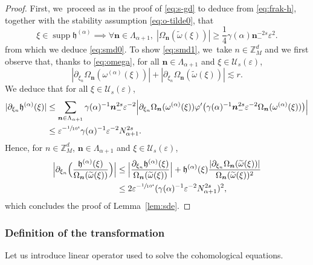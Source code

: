 \documentclass[JEP,XML,SOM,Unicode,published]{cedram}
\theoremstyle{plain}
\theoremstyle{definition}
\DeclareMathOperator{\supp}{supp}
\newcommand{\nb}{{\boldsymbol n}}
\newcommand{\Z}{\mathbb{Z}}
\newcommand{\1}{\mathbf{1}}
\let\epsilon\varepsilon
\begin{document}
\begin{proof}
First, we~proceed as in the proof of \eqref{eq:s-gd} to deduce from \eqref{eq:frak-h}, together with the stability assumption \eqref{eq:o-tilde0}, that
\begin{equation}
\label{eq:76}
\xi\in\supp \mathfrak{h}^{(\alpha)}\implies \forall \nb\in\Lambda_{\alpha+1},\; |\Omega_{\nb}(\widetilde{\omega}(\xi))|\geq\frac{1}{4}\gamma(\alpha)\nb_{-}^{-2s}\epsilon^{2}.
\end{equation}
from which we deduce \eqref{eq:smd0}. To show \eqref{eq:smd1}, we~take $n\in\Z_{M}^{d}$ and we first observe that, thanks to \eqref{eq:omega}, for all $\nb\in\Lambda_{\alpha+1}$ and $\xi\in\mathcal{U}_{s}(\epsilon)$,
\[
|\partial_{\xi_{n}}\Omega_{\nb}(\omega^{(\alpha)}(\xi))|
+
|\partial_{\xi_{n}}\Omega_{\nb}(\widetilde{\omega}(\xi))| \lesssim r.
\]
We deduce that for all $\xi\in\mathcal{U}_{s}(\epsilon)$,
\begin{equation*}
\begin{split}
\label{eq:dhf}
|\partial_{\xi_{n}}\mathfrak{h}^{(\alpha)}(\xi)|
&\leq \sum_{\nb\in\Lambda_{\alpha+1}}\gamma(\alpha)^{-1}\nb_{-}^{2s}\epsilon^{-2}
\Big|
\partial_{\xi_{n}}\Omega_{\nb}(\omega^{(\alpha)}(\xi))
\varphi'
\big(
\gamma(\alpha)^{-1}\nb_{-}^{2s}\epsilon^{-2}\Omega_{\nb}(\omega^{(\alpha)}(\xi))
\big)
\Big| \\
&\leq \epsilon^{-\sfrac{1}{10^{4}}}\gamma(\alpha)^{-1}\epsilon^{-2}N_{\alpha+1}^{2s}.
\end{split}
\end{equation*}
Hence, for $n\in\Z_{M}^{d}$, $\nb\in\Lambda_{\alpha+1}$ and $\xi\in\mathcal{U}_{s}(\epsilon)$,
\begin{align*}
\Big|\partial_{\xi_{n}}\Big(
\frac{\mathfrak{h}^{(\alpha)}(\xi)}{\Omega_{\nb}(\widetilde{\omega}(\xi))}
\Big)
\Big|
&\leq
\Big|
\frac{\partial_{\xi_{n}}\mathfrak{h}^{(\alpha)}(\xi)}{\Omega_{\nb}(\widetilde{\omega}(\xi))}
\Big|
+
\mathfrak{h}^{(\alpha)}(\xi)
\frac{|\partial_{\xi_{n}}\Omega_{\nb}(\widetilde{\omega}(\xi))|}{\Omega_{\nb}(\widetilde{\omega}(\xi))^{2}}\\
&\leq 2\epsilon^{-\sfrac{1}{10^{4}}}(\gamma(\alpha)^{-1}\epsilon^{-2}N_{\alpha+1}^{2s})^{2},
\end{align*}
which concludes the proof of Lemma~\ref{lem:sde}.
\end{proof}
\subsubsection{Definition of the transformation}
\label{sec:Lie} Let us introduce linear operator used to solve the cohomological equations.
\end{document}
